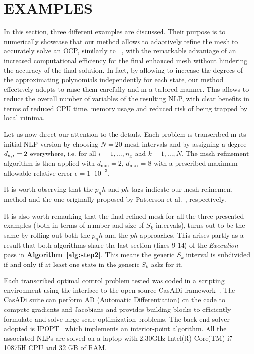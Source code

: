 \section*{EXAMPLES}
In this section, three different examples are discussed. Their purpose is to numerically showcase that our method allows to adaptively refine the mesh to accurately solve an OCP, similarly to ~\cite{Patterson:OCAM:2015}, with the remarkable advantage of an increased computational efficiency for the final enhanced mesh without hindering the accuracy of the final solution.
In fact, by allowing to increase the degrees of the approximating polynomials independently for each state, our method effectively adopts to raise them carefully and in a tailored manner. This allows to reduce the overall number of variables of the resulting NLP, with clear benefits in terms of reduced CPU time, memory usage and reduced risk of being trapped by local minima.

Let us now direct our attention to the details. Each problem is transcribed in its initial NLP version by choosing $N = 20$ mesh intervals and by assigning a degree $d_{k,i} = 2$ everywhere, i.e. for all $i = 1, \dots, n_x$ and  $k = 1, \dots, N$. The mesh refinement algorithm is then applied with $d_{\min} = 2$, $d_{\max} = 8$ with a prescribed maximum allowable relative error $\epsilon = 1 \cdot 10^{-3}$.

It is worth observing that the $p_{n}h$ and $ph$ tags indicate our mesh refinement method and the one originally proposed by Patterson et al.~\cite{Patterson:OCAM:2015}, respectively.

It is also worth remarking that the final refined mesh for all the three presented examples (both in terms of number and size of $S_{k}$ intervals), turns out to be the same by rolling out both the $p_{n}h$ and the $ph$ approaches. This arises partly as a result that both algorithms share the last section (lines 9-14) of the \emph{Execution} pass in {\bf Algorithm~\ref{alg:step2}}. This means the generic $S_k$ interval is subdivided if and only if at least one state in the generic $S_k$ asks for it.

Each transcribed optimal control problem tested was coded in a scripting environment using the  interface to the open-source CasADi framework~\cite{casadi:MPC:2019}.
The CasADi suite can perform AD (Automatic Differentiation) on the code to compute gradients and Jacobians and provides building blocks to efficiently formulate and solve large-scale optimization problems. The back-end solver adopted is IPOPT~\cite{Biegler:CCE:2009} which implements an interior-point algorithm. All the associated NLPs are solved on a laptop with 2.30GHz Intel(R) Core(TM) i7-10875H CPU and 32 GB of RAM.



